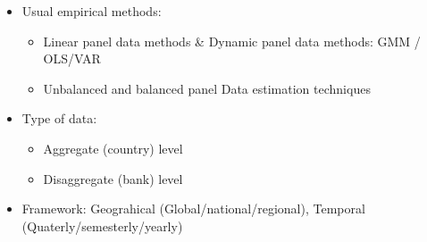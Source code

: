 \documentclass[aspectratio=169]{beamer}\usepackage[]{graphicx}\usepackage[]{color}
\begin{document}
{\begin{itemize}
\begin{itemize}
           
           \end {itemize}
           
           \item Usual empirical methods:
         
        \begin{itemize} 
        \item Linear  panel data methods & Dynamic panel data methods: GMM / OLS/VAR
        \item Unbalanced and balanced panel Data estimation techniques
        \end {itemize}
 
\item Type of data:
      \begin{itemize}
      \item Aggregate  (country) level
      \item Disaggregate (bank) level
      \end {itemize}
      
\item Framework: Geograhical (Global/national/regional), Temporal (Quaterly/semesterly/yearly)

 \end {itemize}


}

% 
% 
%     
% 
% 
% 
% 
% 



 
 
\end{document}
